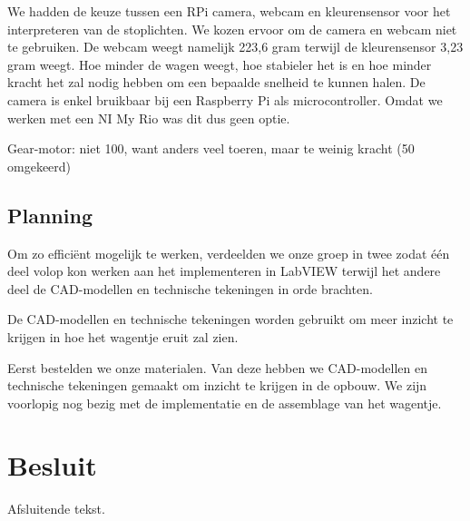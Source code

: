 \documentclass[a4paper,twoside,kulak]{kulakreport} %
\begin{document}
We hadden de keuze tussen een RPi camera, webcam en kleurensensor voor het interpreteren van de stoplichten. We kozen ervoor om de camera en webcam niet te gebruiken. De webcam weegt namelijk 223,6 gram terwijl de kleurensensor 3,23 gram weegt. Hoe minder de wagen weegt, hoe stabieler het is en hoe minder kracht het zal nodig hebben om een bepaalde snelheid te kunnen halen. De camera is enkel bruikbaar bij een Raspberry Pi als microcontroller. Omdat we werken met een NI My Rio was dit dus geen optie. 

Gear-motor: niet 100, want anders veel toeren, maar te weinig kracht (50 omgekeerd)

\section{Planning}

Om zo efficiënt mogelijk te werken, verdeelden we onze groep in twee zodat één deel volop kon werken aan het implementeren in LabVIEW terwijl het andere deel de CAD-modellen en technische tekeningen in orde brachten. 


De CAD-modellen en technische tekeningen worden gebruikt om meer inzicht te krijgen in hoe het wagentje eruit zal zien.




Eerst bestelden we onze materialen. Van deze hebben we CAD-modellen en technische tekeningen gemaakt om inzicht te krijgen in de opbouw. We zijn voorlopig nog bezig met de implementatie en de assemblage van het wagentje.



\chapter*{Besluit}
Afsluitende tekst.




\end{document}
